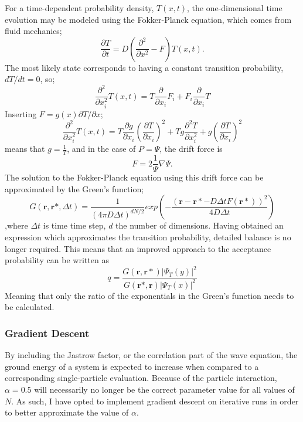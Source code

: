 \documentclass[%
oneside,                 %
final,                   %
10pt]{article}
\begin{document}
For a time-dependent probability density, $T(x,t)$, the one-dimensional time evolution may be modeled using the Fokker-Planck equation, which comes from fluid mechanics;
\begin{equation}
\frac{\partial T}{\partial t} = D (\frac{\partial^2}{\partial x^2}-F) T(x,t).
\end{equation}
The most likely state corresponds to having a constant transition probability, $dT/dt=0$, so; 
\begin{equation}
\frac{\partial^2}{\partial x_i^2} T(x,t) = T \frac{\partial}{\partial x_i} F_i + F_i \frac{\partial }{\partial x_i} T
\end{equation}
Inserting $F= g(x) \partial T/\partial x$;
\begin{equation}
\frac{\partial^2}{\partial x_i^2} T(x,t) = T \frac{\partial g }{\partial x_i}( \frac{\partial T }{\partial x_i})^2  + T g  \frac{\partial^2 T }{\partial x_i^2} + g(\frac{\partial T}{\partial x_i})^2
\end{equation}
means that $g=\frac{1}{T}$, and in the case of $P=\Psi$, the drift force is
\begin{equation}
F=2\frac{1}{\Psi} \nabla \Psi.
\end{equation}
The solution to the Fokker-Planck equation using this drift force can be approximated by the Green's function;
\begin{equation}
G(\bm r,\bm r*,\Delta t) = \frac{1}{(4 \pi D \Delta t)^{dN/2}} exp\left(-\frac{(\bm r-\bm r*-D\Delta t F(\bm r*))^2}{4D\Delta t}\right)
\end{equation}
,where $\Delta t$ is time time step, $d$ the number of dimensions. Having obtained an expression which approximates the transition probability, detailed balance is no longer required. This means that an improved approach to the acceptance probability can be written as
\begin{equation}
q=\frac{G(\bm r,\bm r*)|\Psi_T(y)|^2}{G(\bm r*,\bm r)|\Psi_T(x)|^2}
\end{equation}
Meaning that only the ratio of the exponentials in the Green's function needs to be calculated.

\subsubsection{Gradient Descent} \label{SD}
By including the Jastrow factor, or the correlation part of the wave equation, the ground energy of a system is expected to increase when compared to a corresponding single-particle evaluation. Because of the particle interaction, $\alpha=0.5$ will necessarily no longer be the correct parameter value for all values of $N$. As such, I have opted to implement gradient descent on iterative runs in order to better approximate the value of $\alpha$.
\end{document}
